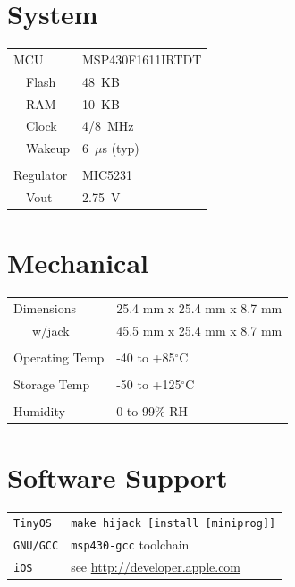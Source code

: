 \documentclass[10pt,letterpaper]{datasheet}
\begin{document}
\begin{multicols}{2}

\section*{System}

\begin{tabular}{p{0.75in} l}
MCU          & MSP430F1611IRTDT\\
~~Flash      & 48~KB\\
~~RAM        & 10~KB\\
~~Clock      & 4/8~MHz\\
~~Wakeup     & 6~$\mu$s (typ)\\
\\
Regulator    & MIC5231\\
~~Vout       & 2.75~V\\
\end{tabular}

\section*{Mechanical}

\begin{tabular}{p{1.05in} l}

\\
Dimensions     & 25.4 mm x 25.4 mm x 8.7 mm\\
~~~w/jack      & 45.5 mm x 25.4 mm x 8.7 mm\\
\\
Operating Temp & -40 to +85$^\circ$C \\ 
\\
Storage Temp   & -50 to +125$^\circ$C \\
\\
Humidity       & 0 to 99\% RH
\end{tabular}


\section*{Software Support}

\begin{tabular}{p{0.5in} l}

{\tt TinyOS}  & {\tt make hijack [install [miniprog]]}\\
{\tt GNU/GCC} & {\tt msp430-gcc} toolchain\\
{\tt iOS}     & see \url{http://developer.apple.com}\\
\end{tabular}



\end{multicols}
\end{document}
